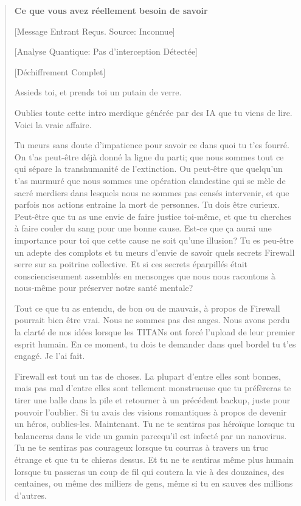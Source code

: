 \begin{quotation} 

\textbf{Ce que vous avez réellement besoin de savoir} 

[Message Entrant Reçus. Source: Inconnue] 

[Analyse Quantique: Pas d'interception Détectée] 

[Déchiffrement Complet] 

Assieds toi, et prends toi un putain de verre. 

Oublies toute cette intro merdique générée par des IA que tu viens de lire.
Voici la vraie affaire. 

Tu meurs sans doute d'impatience pour savoir ce dans quoi tu t'es fourré. On
t'as peut-être déjà donné la ligne du parti; que nous sommes tout ce qui sépare
la transhumanité de l'extinction. Ou peut-être que quelqu'un t'as murmuré que
nous sommes une opération clandestine qui se mèle de sacré merdiers dans
lesquels nous ne sommes pas censés intervenir, et que parfois nos actions
entraine la mort de personnes. Tu dois être curieux. Peut-être que tu as une
envie de faire justice toi-même, et que tu cherches à faire couler du sang pour
une bonne cause.  Est-ce que ça aurai une importance pour toi que cette cause
ne soit qu'une illusion? Tu es peu-être un adepte des complots et tu meurs
d'envie de savoir quels secrets Firewall serre sur sa poitrine collective. Et
si ces secrets éparpillés était conscienciseument assemblés en mensonges que
nous nous racontons à nous-même pour préserver notre santé mentale? 

Tout ce que tu as entendu, de bon ou de mauvais, à propos de Firewall pourrait
bien être vrai. Nous ne sommes pas des anges. Nous avons perdu la clarté de nos
idées lorsque les TITANs ont forcé l'upload de leur premier esprit humain. En
ce moment, tu dois te demander dans quel bordel tu t'es engagé. Je l'ai fait. 

Firewall est tout un tas de choses. La plupart d'entre elles sont bonnes, mais
pas mal d'entre elles sont tellement monstrueuse que tu préfèreras te tirer une
balle dans la pile et retourner à un précédent backup, juste pour pouvoir
l'oublier. Si tu avais des visions romantiques à propos de devenir un héros,
oublies-les. Maintenant. Tu ne te sentiras pas héroïque lorsque tu balanceras
dans le vide un gamin parcequ'il est infecté par un nanovirus. Tu ne te
sentiras pas courageux lorsque tu courras à travers un truc étrange et que tu
te chieras dessus. Et tu ne te sentiras même plus humain lorsque tu passeras un
coup de fil qui coutera la vie à des douzaines, des centaines, ou même des
milliers de gens, même si tu en sauves des millions d'autres. 


\end{quotation}
